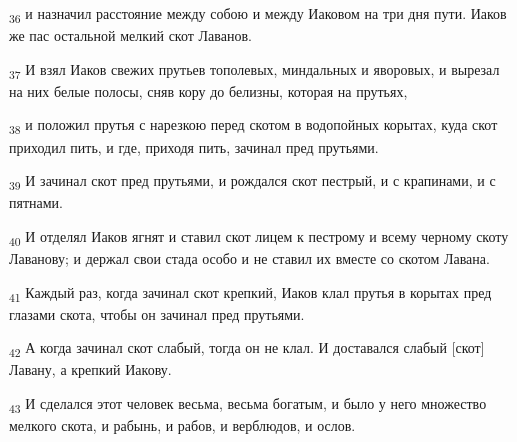 \begin{tcolorbox}
\textsubscript{36} и назначил расстояние между собою и между Иаковом на три дня пути. Иаков же пас остальной мелкий скот Лаванов.
\end{tcolorbox}
\begin{tcolorbox}
\textsubscript{37} И взял Иаков свежих прутьев тополевых, миндальных и яворовых, и вырезал на них белые полосы, сняв кору до белизны, которая на прутьях,
\end{tcolorbox}
\begin{tcolorbox}
\textsubscript{38} и положил прутья с нарезкою перед скотом в водопойных корытах, куда скот приходил пить, и где, приходя пить, зачинал пред прутьями.
\end{tcolorbox}
\begin{tcolorbox}
\textsubscript{39} И зачинал скот пред прутьями, и рождался скот пестрый, и с крапинами, и с пятнами.
\end{tcolorbox}
\begin{tcolorbox}
\textsubscript{40} И отделял Иаков ягнят и ставил скот лицем к пестрому и всему черному скоту Лаванову; и держал свои стада особо и не ставил их вместе со скотом Лавана.
\end{tcolorbox}
\begin{tcolorbox}
\textsubscript{41} Каждый раз, когда зачинал скот крепкий, Иаков клал прутья в корытах пред глазами скота, чтобы он зачинал пред прутьями.
\end{tcolorbox}
\begin{tcolorbox}
\textsubscript{42} А когда зачинал скот слабый, тогда он не клал. И доставался слабый [скот] Лавану, а крепкий Иакову.
\end{tcolorbox}
\begin{tcolorbox}
\textsubscript{43} И сделался этот человек весьма, весьма богатым, и было у него множество мелкого скота, и рабынь, и рабов, и верблюдов, и ослов.
\end{tcolorbox}
